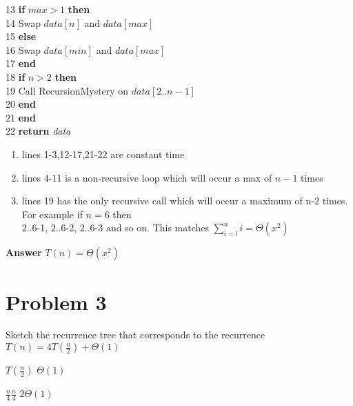 \documentclass[12pt, letterpaper]{article}
\begin{document}
{\begin{minipage}{\textwidth}
        13  \hspace*{4mm} \textbf{if} $max > 1$ \textbf{then} \\
        14      \hspace*{8mm} Swap $data[n]$ and $data[max]$ \\
        15  \hspace*{4mm} \textbf{else} \\
        16      \hspace*{8mm} Swap $data[min]$ and $data[max]$ \\
        17  \hspace*{4mm} \textbf{end} \\
        18  \hspace*{4mm} \textbf{if} $n>2$ \textbf{then} \\
        19      \hspace*{8mm} Call RecursionMystery on $data[2..n-1]$ \\
        20  \hspace*{4mm} \textbf{end} \\
        21 \textbf{end} \\
        22 \textbf{return} \textit{data}
    \end{minipage}
}

\begin{enumerate}
    \item lines 1-3,12-17,21-22 are constant time
    \item lines 4-11 is a non-recursive loop which will occur a max of $n-1$ times
    \item lines 19 has the only recursive call which will occur a maximum of n-2 times. For example if $n=6$ then \\
        2..6-1, 2..6-2, 2..6-3 and so on.  This matches $\sum_{i=l}^{n}{i} = \Theta(x^2)$
\end{enumerate}

\textbf{Answer} $T(n) = \Theta(x^2)$

\section*{Problem 3}

Sketch the recurrence tree that corresponds to the recurrence $T(n) = 4T(\frac{n}{2}) + \Theta(1)$

\hspace*{1mm}$T(\frac{n}{2})$ \hspace*{12mm}$\Theta(1)$

\hspace*{2mm}$\frac{n}{4}$\hspace*{5mm}$\frac{n}{4}$ \hspace*{8mm}$2\Theta(1)$
\end{document}
